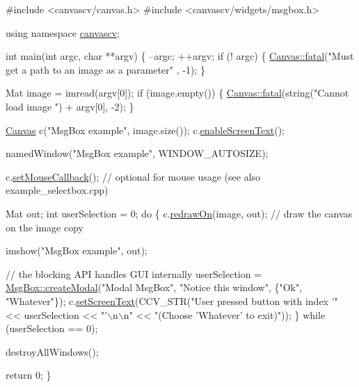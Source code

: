 \begin{DoxyCode}
\textcolor{preprocessor}{#include <canvascv/canvas.h>}
\textcolor{preprocessor}{#include <canvascv/widgets/msgbox.h>}

\textcolor{keyword}{using namespace }\hyperlink{namespacecanvascv}{canvascv};

\textcolor{keywordtype}{int} main(\textcolor{keywordtype}{int} argc, \textcolor{keywordtype}{char} **argv)
\{
    --argc;
    ++argv;
    \textcolor{keywordflow}{if} (! argc)
    \{
        \hyperlink{classcanvascv_1_1Canvas_add93c0d5cc1e9b49f97510952a8a1961}{Canvas::fatal}(\textcolor{stringliteral}{"Must get a path to an image as a parameter"} , -1);
    \}

    Mat image = imread(argv[0]);
    \textcolor{keywordflow}{if} (image.empty())
    \{
        \hyperlink{classcanvascv_1_1Canvas_add93c0d5cc1e9b49f97510952a8a1961}{Canvas::fatal}(\textcolor{keywordtype}{string}(\textcolor{stringliteral}{"Cannot load image "}) + argv[0], -2);
    \}

    \hyperlink{classcanvascv_1_1Canvas}{Canvas} c(\textcolor{stringliteral}{"MsgBox example"}, image.size());
    c.\hyperlink{classcanvascv_1_1Canvas_ae68d3277e738d349232400b38f0e5f9e}{enableScreenText}();

    namedWindow(\textcolor{stringliteral}{"MsgBox example"}, WINDOW\_AUTOSIZE);

    c.\hyperlink{classcanvascv_1_1Canvas_acf6e5d4b40aec610b0dc8c4f6bf93ac1}{setMouseCallback}(); \textcolor{comment}{// optional for mouse usage (see also example\_selectbox.cpp)}

    Mat out;
    \textcolor{keywordtype}{int} userSelection = 0;
    \textcolor{keywordflow}{do}
    \{
        c.\hyperlink{classcanvascv_1_1Canvas_a018c66e277de7904b8146ea3f3feebdd}{redrawOn}(image, out);  \textcolor{comment}{// draw the canvas on the image copy}

        imshow(\textcolor{stringliteral}{"MsgBox example"}, out);

        \textcolor{comment}{// the blocking API handles GUI internally}
        userSelection = \hyperlink{classcanvascv_1_1MsgBox_a1eb6af15c2393ce6cda9ce277c01d200}{MsgBox::createModal}(\textcolor{stringliteral}{"Modal MsgBox"}, \textcolor{stringliteral}{"Notice this window"}, \{\textcolor{stringliteral}{"Ok"},
       \textcolor{stringliteral}{"Whatever"}\});
        c.\hyperlink{classcanvascv_1_1Canvas_aaedea276b82a8a4cfc0895ae81113cfd}{setScreenText}(CCV\_STR(\textcolor{stringliteral}{"User pressed button with index '"} << userSelection << \textcolor{stringliteral}{"'\(\backslash\)n\(\backslash\)n"}
       <<
                                \textcolor{stringliteral}{"(Choose 'Whatever' to exit)"}));
    \} \textcolor{keywordflow}{while} (userSelection == 0);

    destroyAllWindows();

    \textcolor{keywordflow}{return} 0;
\}
\end{DoxyCode}



